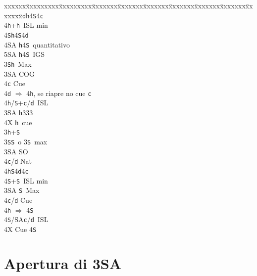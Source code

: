 \documentclass[a4paper,italian]{article}
\newcommand{\BS}{\small{\texttt{S}}}
\newcommand{\BC}{\small{\texttt{c}}}
\newcommand{\BD}{\small{\texttt{d}}}
\newcommand{\BH}{\small{\texttt{h}}}
\newenvironment{bidtable}
{\begin{tabbing}

    xxxxxx\=xxxxxxxxx\=xxxxxxxxx\=xxxxxxx\=xxxxxxx\=xxxxxxx\=xxxxxxx\=xxxxxxx\=xxxxxxx\=xxxxxxx\=\kill}
{\end{tabbing} }%
\begin{document}
\begin{multicols}{2}
\begin{bidtable}
        4\BD {}\BH 4\BS 4\BC \\
        4\BH {}+\BH\ ISL min\\
        4\BS {}\BH 4\BS 4\BD \\
        4\small{SA} \BH 4\BS\ quantitativo\\
        5\small{SA} \BH 4\BS\ IGS\-\\
        3\BS {}\BH\ Max\+\\
        3\small{SA}\> COG\\
        4\BC\> Cue\\
        4\BD\> $\Rightarrow$ 4\BH, se riapre no cue \BC\\
        4\BH/\BS{}+\BC/\BD\ ISL\-\\
        3\small{SA} \BH 333\\
        4X \BH\ cue\-\\
        3\BH {}+\BS \+\\
        3\BS {}\BS\ o 3\BS\ max\+\\
        3\small{SA} \> SO\\
        4\BC/\BD \> Nat\\
        4\BH {}\BS 4\BD 4\BC \\
        4\BS {}+\BS\ ISL min\-\\
        3\small{SA} \BS\ Max\+\\
        4\BC/\BD\> Cue\\
        4\BH\> $\Rightarrow$ 4\BS\\
        4\BS/SA\BC/\BD\ ISL\-\\
        4X \> Cue 4\BS\\
    \end{bidtable}
\end{multicols}

\section{Apertura di 3\small{SA}}
\end{document}
